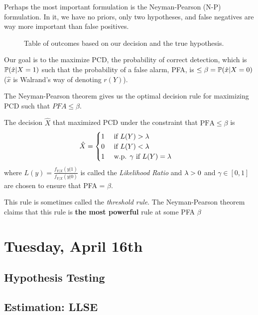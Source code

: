 \documentclass[11 pt]{scrartcl}
\begin{document}
Perhaps the most important formulation is the Neyman-Pearson (N-P) formulation. In it, we have no priors, only two hypotheses, and false negatives are way more important than false positives. 

\begin{figure}[!htb]
\centering

\caption{Table of outcomes based on our decision and the true hypothesis.}
\end{figure}

Our goal is to the maximize PCD, the probability of correct detection, which is $\mathbb P(\hat{x} | X = 1)$ such that the probability of a false alarm, PFA, is $\leq \beta = \mathbb P(\hat{x} | X = 0)$ ($\hat{x}$ is Walrand's way of denoting $r(Y)$). 

The Neyman-Pearson theorem gives us the optimal decision rule for maximizing PCD such that $PFA \leq \beta$. 

\begin{theorem}
    The decision $\hat{X}$ that maximized PCD under the constraint that $\text{PFA}\leq \beta$ is 
    \[ 
        \hat{X} = 
        \begin{cases} 
            1 \quad \text{ if } L(Y) > \lambda \\ 
            0 \quad \text{ if } L(Y) < \lambda \\ 
            1 \quad \text{ w.p. } \gamma \text{ if } L(Y) = \lambda 
        \end{cases}
    \]
    where $L(y) = \frac{f_{Y|X}(y|1)}{f_{Y|X}(y|0)}$ is called the \emph{Likelihood Ratio} and $\lambda > 0$ and $\gamma \in [0,1]$ are chosen to ensure that PFA = $\beta$. 
\end{theorem}

This rule is sometimes called the \emph{threshold rule}. The Neyman-Pearson theorem claims that this rule is \textbf{the most powerful} rule at some PFA $\beta$

\newpage
\section{Tuesday, April 16th}

\subsection{Hypothesis Testing}



\subsection{Estimation: LLSE}
\end{document}
